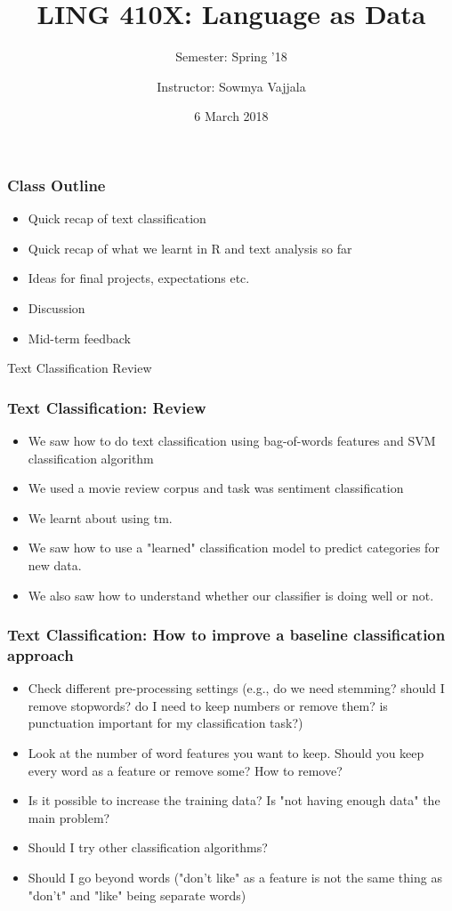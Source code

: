 \documentclass{beamer}
\author[Sowmya Vajjala]{Instructor: Sowmya Vajjala}
\title[LING 410X]{LING 410X: Language as Data}
\subtitle{Semester: Spring '18}
\date{6 March 2018}
\institute{Iowa State University, USA}
\begin{document}
\begin{frame}\titlepage
\end{frame}

\begin{frame}
\frametitle{Class Outline}
\begin{itemize}
\item Quick recap of text classification %
\item Quick recap of what we learnt in R and text analysis so far %
\item Ideas for final projects, expectations etc.%
\item Discussion %
\item Mid-term feedback%
\end{itemize}
\end{frame}

\begin{frame}
\centering \Large Text Classification Review
\end{frame}

\begin{frame}
\frametitle{Text Classification: Review}
\begin{itemize}
\item We saw how to do text classification using bag-of-words features and SVM classification algorithm \pause
\item We used a movie review corpus and task was sentiment classification \pause
\item We learnt about using tm. \pause
\item We saw how to use a "learned" classification model to predict categories for new data.
\item We also saw how to understand whether our classifier is doing well or not.
\end{itemize}
\end{frame}

\begin{frame}
\frametitle{Text Classification: How to improve a baseline classification approach}
\begin{itemize}
\item Check different pre-processing settings (e.g., do we need stemming? should I remove stopwords? do I need to keep numbers or remove them? is punctuation important for my classification task?) \pause
\item Look at the number of word features you want to keep. Should you keep every word as a feature or remove some? How to remove? \pause
\item Is it possible to increase the training data? Is "not having enough data" the main problem? \pause
\item Should I try other classification algorithms? \pause
\item Should I go beyond words ("don't like" as a feature is not the same thing as "don't" and "like" being separate words)
\end{itemize}
\end{frame}
\end{document}
